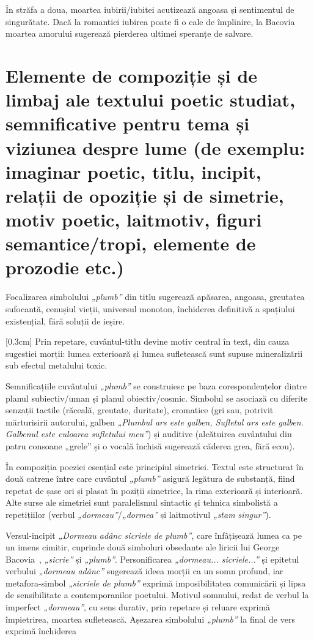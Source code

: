 \documentclass[
12pt,                        %
a4paper                      %
]{article}
\newcommand{\operaauthor}{George Bacovia\ } %
\begin{document}
În străfa a doua, moartea iubirii/iubitei acutizează angoasa și sentimentul de singurătate. Dacă la romantici iubirea poate fi o cale de împlinire, la Bacovia moartea amorului sugerează pierderea ultimei speranțe de salvare.

\section{Elemente de compoziție și de limbaj ale textului poetic studiat, semnificative pentru tema și viziunea despre lume {\footnotesize (de exemplu: imaginar poetic, titlu, incipit, relații de opoziție și de simetrie, motiv poetic, laitmotiv, figuri semantice/tropi, elemente de prozodie etc.)}}

Focalizarea simbolului \textit{„plumb”} din titlu sugerează apăsarea, angoasa, greutatea sufocantă, cenușiul vieții, universul monoton, închiderea definitivă a spațiului existențial, fără soluții de ieșire.

[0.3cm]
Prin repetare, cuvântul-titlu devine motiv central în text, din cauza sugestiei morții: lumea exterioară și lumea sufletească sunt supuse mineralizării sub efectul metalului toxic.

Semnificațiile cuvântului \textit{„plumb”} se construiesc pe baza corespondențelor dintre planul subiectiv/uman și planul obiectiv/cosmic. Simbolul se asociază cu diferite senzații tactile (răceală, greutate, duritate), cromatice (gri sau, potrivit mărturisirii autorului, galben \textit{„Plumbul ars este galben, Sufletul ars este galben. Galbenul este culoarea sufletului meu”}) și auditive (alcătuirea cuvântului din patru consoane „grele” și o vocală închisă sugerează căderea grea, fără ecou).

În compoziția poeziei esențial este principiul simetriei. Textul este structurat în două catrene între care cuvântul \textit{„plumb”} asigură legătura de substanță, fiind repetat de șase ori și plasat în poziții simetrice, la rima exterioară și interioară. Alte surse ale simetriei sunt paralelismul sintactic și tehnica simbolistă a repetițiilor (verbul \textit{„dormeau”}/\textit{„dormea”} și laitmotivul \textit{„stam singur”}).

Versul-incipit \textit{„Dormeau adânc sicriele de plumb”}, care înfâțișează lumea ca pe un imens cimitir, cuprinde două simboluri obsedante ale liricii lui \operaauthor, \textit{„sicrie”} și \textit{„plumb”}. Personificarea \textit{„dormeau... sicriele...”} și epitetul verbului \textit{„dormeau adânc”} sugerează ideea morții ca un somn profund, iar metafora-simbol \textit{„sicriele de plumb”} exprimă imposibilitatea comunicării și lipsa de sensibilitate a contemporanilor poetului. Motivul somnului, redat de verbul la imperfect \textit{„dormeau”}, cu sens durativ, prin repetare și reluare exprimă împietrirea, moartea sufletească. Așezarea simbolului \textit{„plumb”} la final de vers exprimă închiderea
\end{document}
